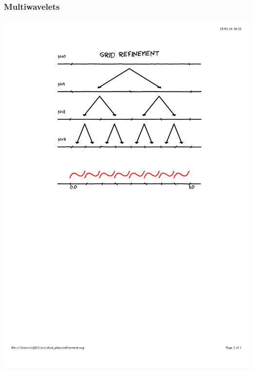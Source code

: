 \begin{frame}
\frametitle{Multiwavelets}
\centering
\includegraphics[scale=0.5, clip, viewport=100 400 500 800]{figures/refinement.pdf}
\end{frame}

